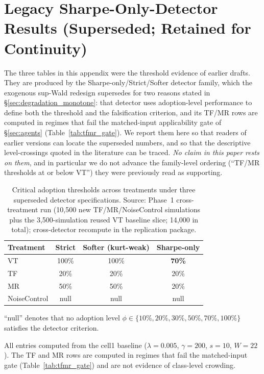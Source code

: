 \documentclass[12pt,a4paper]{article}
\begin{document}
\appendix
\section{Legacy Sharpe-Only-Detector Results (Superseded; Retained for Continuity)}
\label{app:legacy}

The three tables in this appendix were the threshold evidence of earlier drafts. They are produced by the Sharpe-only/Strict/Softer detector family, which the exogenous sup-Wald redesign supersedes for two reasons stated in \S\ref{sec:degradation_monotone}: that detector uses adoption-level performance to define both the threshold and the falsification criterion, and its TF/MR rows are computed in regimes that fail the matched-input applicability gate of \S\ref{sec:agents} (Table~\ref{tab:tfmr_gate}). We report them here so that readers of earlier versions can locate the superseded numbers, and so that the descriptive level-crossings quoted in the literature can be traced. \emph{No claim in this paper rests on them}, and in particular we do not advance the family-level ordering (``TF/MR thresholds at or below VT'') they were previously read as supporting.

\begin{table}[H]
\centering
\caption{Critical adoption thresholds across treatments under three superseded detector specifications. Source: Phase~1 cross-treatment run (10{,}500 new TF/MR/NoiseControl simulations plus the 3{,}500-simulation reused VT baseline slice; 14{,}000 in total); cross-detector recompute in the replication package.}
\label{tab:cross_strategy_threshold}
\begin{threeparttable}
\begin{tabular}{lccc}
\toprule
Treatment & Strict & Softer (kurt-weak) & Sharpe-only \\
\midrule
VT       & 100\% & 100\% & \textbf{70\%} \\
TF       & 20\%  & 20\%  & 20\% \\
MR       & 50\%  & 50\%  & 20\% \\
NoiseControl & null & null & null \\
\bottomrule
\end{tabular}
\begin{tablenotes}
\footnotesize
\item ``null'' denotes that no adoption level $\phi \in \{10\%, 20\%, 30\%, 50\%, 70\%, 100\%\}$ satisfies the detector criterion.
\item All entries computed from the cell1 baseline ($\lambda = 0.005$, $\gamma = 200$, $s = 10$, $W = 22$). The TF and MR rows are computed in regimes that fail the matched-input gate (Table~\ref{tab:tfmr_gate}) and are not evidence of class-level crowding.
\end{tablenotes}
\end{threeparttable}
\end{table}
\end{document}
